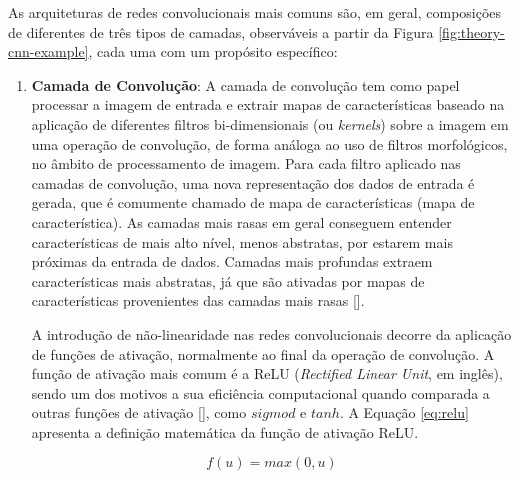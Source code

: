 As arquiteturas de redes convolucionais mais comuns são, em geral, composições de diferentes de três tipos de camadas, observáveis a partir da Figura \ref{fig:theory-cnn-example}, cada uma com um propósito específico:
\begin{enumerate}
    \item \textbf{Camada de Convolução}:
            A camada de convolução tem como papel processar a imagem de entrada e extrair mapas de características baseado na aplicação de diferentes filtros bi-dimensionais (ou \textit{kernels}) sobre a imagem em uma operação de convolução, de forma análoga ao uso de filtros morfológicos, no âmbito de processamento de imagem. Para cada filtro aplicado nas camadas de convolução, uma nova representação dos dados de entrada é gerada, que é comumente chamado de mapa de características (mapa de característica). As camadas mais rasas em geral conseguem entender características de mais alto nível, menos abstratas, por estarem mais próximas da entrada de dados. Camadas mais profundas extraem características mais abstratas, já que são ativadas por mapas de características provenientes das camadas mais rasas [].
        
            A introdução de não-linearidade nas redes convolucionais decorre da aplicação de funções de ativação, normalmente ao final da operação de convolução. A função de ativação mais comum é a ReLU (\textit{Rectified Linear Unit}, em inglês), sendo um dos motivos a sua eficiência computacional quando comparada a outras funções de ativação [], como $sigmod$ e $tanh$. A Equação \ref{eq:relu} apresenta a definição matemática da função de ativação ReLU.
            
            \begin{equation}
                f(u) = max(0,u)
                \label{eq:relu}
            \end{equation}
            

\end{enumerate}

